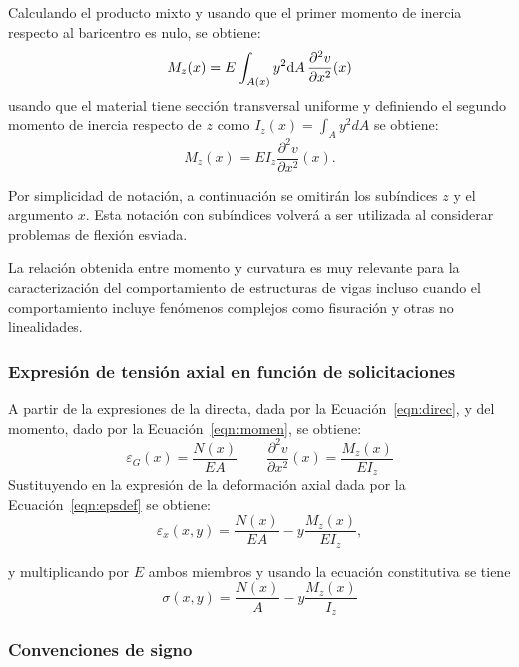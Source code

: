 Calculando el producto mixto y usando que el primer momento de inercia respecto al baricentro es nulo, se obtiene:
%
\begin{equation}
M_z (x) = E \int_{A(x)} y^2 {\text{d}} A \,  \frac{\partial^2 v}{\partial x^2} (x)
\end{equation}
%
usando que el material tiene sección transversal uniforme y definiendo el segundo momento de inercia respecto de $z$ como $I_z(x) = \int_{A} y^2 dA$ se obtiene:
%
\begin{equation}\label{eqn:momen}
\boxed{
M_z (x) = E I_z \frac{\partial^2 v}{\partial x^2}(x).
}
\end{equation}

Por simplicidad de notación, a continuación se omitirán los subíndices $z$ y el argumento $x$. %
%
Esta notación con subíndices volverá a ser utilizada al considerar problemas de flexión esviada.

La relación obtenida entre momento y curvatura es muy relevante para la caracterización del comportamiento de estructuras de vigas incluso cuando el comportamiento incluye fenómenos complejos como fisuración y otras no linealidades.


\subsubsection{Expresión de tensión axial en función de solicitaciones}


%
A partir de la expresiones de la directa, dada por la Ecuación~\eqref{eqn:direc}, y del momento, dado por la Ecuación~\eqref{eqn:momen}, se obtiene:
%
\begin{equation}
\varepsilon_G(x) = \frac{	N (x) }{E A}
\qquad
\frac{\partial^2 v}{\partial x^2}(x) = \frac{	M_z (x) }{E I_z} 
\end{equation}
%
Sustituyendo en la expresión de la deformación axial dada por la Ecuación~\eqref{eqn:epsdef} se obtiene:
%
\begin{equation}
\varepsilon_x(x,y) = \frac{	N (x) }{E A}  -y  \frac{ M_z (x) }{E I_z},
\end{equation}

y multiplicando por $E$ ambos miembros y usando la ecuación constitutiva se tiene
%
\begin{equation}
\boxed{
\sigma(x,y) = \frac{	N (x) }{A}
- y \frac{	M_z (x) }{I_z} 
}
\end{equation}


\subsubsection{Convenciones de signo}

